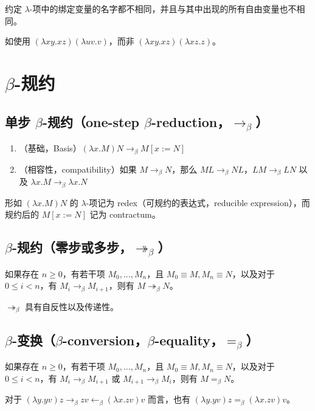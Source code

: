 \documentclass[UTF8]{article}
\begin{document}
	约定 $\lambda$-项中的绑定变量的名字都不相同，并且与其中出现的所有自由变量也不相同。

	如使用 $(\lambda xy.xz)(\lambda uv.v)$，而非 $(\lambda xy.xz)(\lambda xz.z)$。

\section{$\beta$-规约}

\subsection{单步 $\beta$-规约（one-step $\beta$-reduction，$\rightarrow_\beta$）}

	\begin{enumerate}
		\item （基础，Basis）$(\lambda x.M)N \rightarrow_\beta M[x:=N]$
		\item （相容性，compatibility）如果 $M \rightarrow_\beta N$，那么 $ML \rightarrow_\beta NL$，$LM \rightarrow_\beta LN$ 以及 $\lambda x.M\rightarrow_\beta \lambda x.N$
	\end{enumerate}

	形如 $(\lambda x.M)N$ 的 $\lambda$-项记为 redex（可规约的表达式，reducible expression），而规约后的 $M[x:=N]$ 记为 contractum。

\subsection{$\beta$-规约（零步或多步，$\twoheadrightarrow_\beta$）}

	如果存在 $n\ge 0$，有若干项 $M_0, ..., M_n$，且 $M_0 \equiv M, M_n \equiv N$，以及对于 $0 \le i < n$，有 $M_i \rightarrow_\beta M_{i+1}$，则有 $M \twoheadrightarrow_\beta N$。

	$\twoheadrightarrow_\beta$ 具有自反性以及传递性。

\subsection{$\beta$-变换（$\beta$-conversion，$\beta$-equality，$=_\beta$）}

	如果存在 $n\ge 0$，有若干项 $M_0, ..., M_n$，且 $M_0 \equiv M, M_n \equiv N$，以及对于 $0 \le i < n$，有 $M_i \rightarrow_\beta M_{i+1}$ 或 $M_{i+1} \rightarrow_\beta M_i$，则有 $M =_\beta N$。

	对于 $(\lambda y.yv)z \rightarrow_\beta zv \leftarrow_\beta (\lambda x.zv)v$ 而言，也有 $(\lambda y.yv)z =_\beta (\lambda x.zv)v$。
\end{document}
